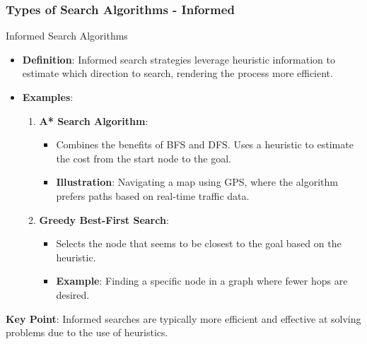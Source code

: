 \documentclass[aspectratio=169]{beamer}
\begin{document}
\begin{frame}[fragile]
    \frametitle{Types of Search Algorithms - Informed}
    \begin{block}{Informed Search Algorithms}
        \begin{itemize}
            \item \textbf{Definition}: Informed search strategies leverage heuristic information to estimate which direction to search, rendering the process more efficient.
            
            \item \textbf{Examples}:
                \begin{enumerate}
                    \item \textbf{A* Search Algorithm}:
                        \begin{itemize}
                            \item Combines the benefits of BFS and DFS. Uses a heuristic to estimate the cost from the start node to the goal.
                            \item \textbf{Illustration}: Navigating a map using GPS, where the algorithm prefers paths based on real-time traffic data.
                        \end{itemize}
                    \item \textbf{Greedy Best-First Search}:
                        \begin{itemize}
                            \item Selects the node that seems to be closest to the goal based on the heuristic.
                            \item \textbf{Example}: Finding a specific node in a graph where fewer hops are desired.
                        \end{itemize}
                \end{enumerate}
        \end{itemize}
        
        \textbf{Key Point}: Informed searches are typically more efficient and effective at solving problems due to the use of heuristics.
    \end{block}
\end{frame}
\end{document}
